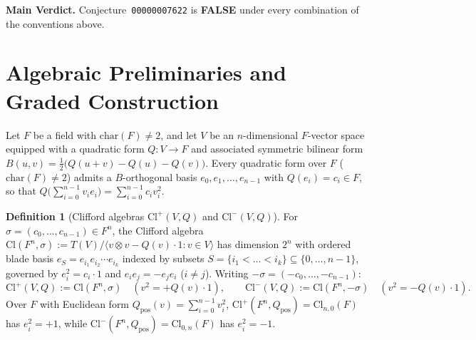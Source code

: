 \documentclass[11pt]{article}
\theoremstyle{definition}
\newtheorem{definition}[theorem]{Definition}
\newcommand{\Cl}{\mathrm{Cl}}
\begin{document}
\textbf{Main Verdict.} Conjecture~\texttt{00000007622} is \textbf{FALSE} under
every combination of the conventions above.

\section{Algebraic Preliminaries and Graded Construction}

Let $F$ be a field with $\mathrm{char}(F) \neq 2$, and let $V$ be an
$n$-dimensional $F$-vector space equipped with a quadratic form $Q : V \to F$ and
associated symmetric bilinear form $B(u, v) = \frac{1}{2}\bigl(Q(u + v) - Q(u) - Q(v)\bigr)$.
Every quadratic form over $F$ ($\mathrm{char}(F) \neq 2$) admits a $B$-orthogonal
basis $e_0, e_1, \dots, e_{n-1}$ with $Q(e_i) = c_i \in F$, so that
$Q\bigl(\sum_{i=0}^{n-1} v_i e_i\bigr) = \sum_{i=0}^{n-1} c_i v_i^2$.

\begin{definition}[Clifford algebras $\Cl^+(V, Q)$ and $\Cl^-(V, Q)$]
For $\sigma = (c_0, \dots, c_{n-1}) \in F^n$, the Clifford algebra
$\Cl(F^n, \sigma) := T(V) / \langle v \otimes v - Q(v)\cdot 1 : v \in V\rangle$
has dimension $2^n$ with ordered blade basis
$e_S = e_{i_1} e_{i_2} \cdots e_{i_k}$ indexed by subsets
$S = \{i_1 < \dots < i_k\} \subseteq \{0, \dots, n-1\}$, governed by
$e_i^2 = c_i \cdot 1$ and $e_i e_j = -e_j e_i$ ($i \neq j$). Writing
$-\sigma = (-c_0, \dots, -c_{n-1})$:
\[
  \Cl^+(V, Q) := \Cl(F^n, \sigma) \quad (v^2 = +Q(v)\cdot 1), \qquad
  \Cl^-(V, Q) := \Cl(F^n, -\sigma) \quad (v^2 = -Q(v)\cdot 1).
\]
Over $F$ with Euclidean form $Q_{\mathrm{pos}}(v) = \sum_{i=0}^{n-1} v_i^2$,
$\Cl^+(F^n, Q_{\mathrm{pos}}) = \Cl_{n,0}(F)$ has $e_i^2 = +1$, while
$\Cl^-(F^n, Q_{\mathrm{pos}}) = \Cl_{0,n}(F)$ has $e_i^2 = -1$.
\end{definition}
\end{document}

